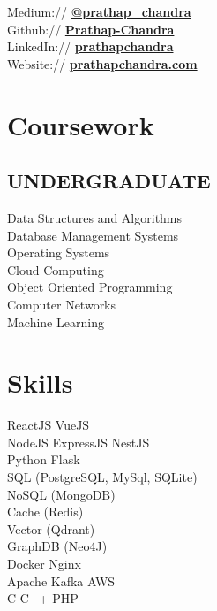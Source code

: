 \documentclass{deedy-resume-openfont}
\begin{document}
\begin{minipage}[t]{0.33\textwidth}
Medium:// \href{https://medium.com/@prathap_chandra/}{\bf @prathap\_chandra} \\
Github:// \href{https://github.com/Prathap-Chandra}{\bf Prathap-Chandra} \\
LinkedIn://  \href{https://www.linkedin.com/in/prathapchandra}{\bf prathapchandra} \\
Website://  \href{https://www.prathapchandra.com/}{\bf prathapchandra.com} \\

\sectionsep
\section{Coursework}
\subsection{UNDERGRADUATE}
Data Structures and Algorithms\\
Database Management Systems\\
Operating Systems\\
Cloud Computing\\
Object Oriented Programming\\
Computer Networks\\
Machine Learning\\
\sectionsep


\section{Skills}
\textbullet{} ReactJS \textbullet{} VueJS \\
\textbullet{} NodeJS \textbullet{} ExpressJS \textbullet{} NestJS\\ 
\textbullet{} Python \textbullet{} Flask\\
\textbullet{} SQL (PostgreSQL, MySql, SQLite) \\ 
\textbullet{} NoSQL (MongoDB) \\ 
\textbullet{} Cache (Redis)  \\ 
\textbullet{} Vector (Qdrant) \\
\textbullet{} GraphDB (Neo4J) \\ 
\textbullet{} Docker \textbullet{} Nginx \\
\textbullet{} Apache Kafka \textbullet{} AWS \\
\textbullet{} C \textbullet{} C++ \textbullet{} PHP\\


\end{minipage}
\end{document}
